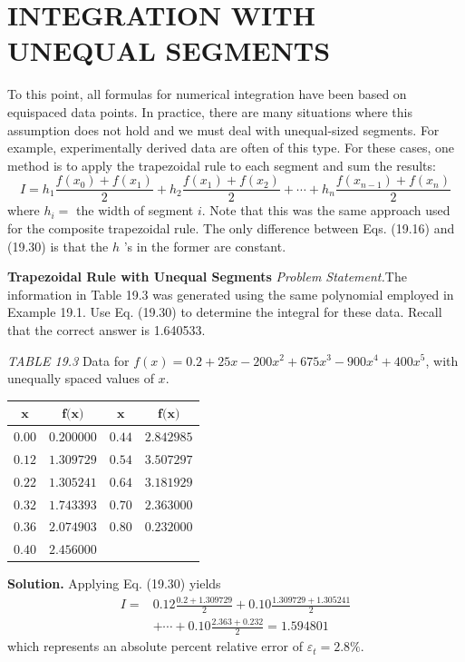 \documentclass[../main.tex]{subfiles}
\begin{document}
\section{INTEGRATION WITH UNEQUAL SEGMENTS}
To this point, all formulas for numerical integration have been based on equispaced data
points. In practice, there are many situations where this assumption does not hold and we
must deal with unequal-sized segments. For example, experimentally derived data are
often of this type. For these cases, one method is to apply the trapezoidal rule to each segment and sum the results:
\begin{equation}
    \tag{19.30}
I=h_{1} \frac{f\left(x_{0}\right)+f\left(x_{1}\right)}{2}+h_{2} \frac{f\left(x_{1}\right)+f\left(x_{2}\right)}{2}+\cdots+h_{n} \frac{f\left(x_{n-1}\right)+f\left(x_{n}\right)}{2}
\end{equation}
where $h_{i}=$ the width of segment $i$. Note that this was the same approach used for the composite trapezoidal rule. The only difference between Eqs. (19.16) and (19.30) is that the $h$ 's in the former are constant.

\begin{exmp} \textbf{Trapezoidal Rule with Unequal Segments}
    \noindent\textit{Problem Statement.}The information in Table 19.3 was generated using the same polynomial employed in Example 19.1. Use Eq. (19.30) to determine the integral for these data.
	Recall that the correct answer is 1.640533.	

	\textit{TABLE 19.3} Data for $f(x)=0.2+25 x-200 x^{2}+675 x^{3}-900 x^{4}+400 x^{5}$, with unequally spaced values of $x$.\\
	\begin{center}
\begin{tabular}{cccc}
	\hline $\boldsymbol{x}$ & $\boldsymbol{f}(\boldsymbol{x} \boldsymbol{)}$ & $\boldsymbol{x}$ & $\boldsymbol{f}(\boldsymbol{x} \boldsymbol{)}$ \\
	\hline $0.00$ & $0.200000$ & $0.44$ & $2.842985$ \\
$0.12$ & $1.309729$ & $0.54$ & $3.507297$ \\
$0.22$ & $1.305241$ & $0.64$ & $3.181929$ \\
$0.32$ & $1.743393$ & $0.70$ & $2.363000$ \\
$0.36$ & $2.074903$ & $0.80$ & $0.232000$ \\
$0.40$ & $2.456000$ & & \\
\hline
\end{tabular}
\end{center}
    \noindent \textbf{Solution.} Applying Eq. (19.30) yields
	$$
	\begin{aligned}
	I=& 0.12 \frac{0.2+1.309729}{2}+0.10 \frac{1.309729+1.305241}{2} \\
	&+\cdots+0.10 \frac{2.363+0.232}{2}=1.594801
	\end{aligned}
	$$
	which represents an absolute percent relative error of $\varepsilon_{t}=2.8 \%$.
\end{exmp}
\end{document}

